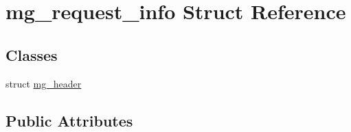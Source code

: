 \hypertarget{structmg__request__info}{\section{mg\-\_\-request\-\_\-info Struct Reference}
\label{structmg__request__info}
}
\subsection*{Classes}
\begin{DoxyCompactItemize}
\item 
struct \hyperlink{structmg__request__info_1_1mg__header}{mg\-\_\-header}
\end{DoxyCompactItemize}
\subsection*{Public Attributes}
